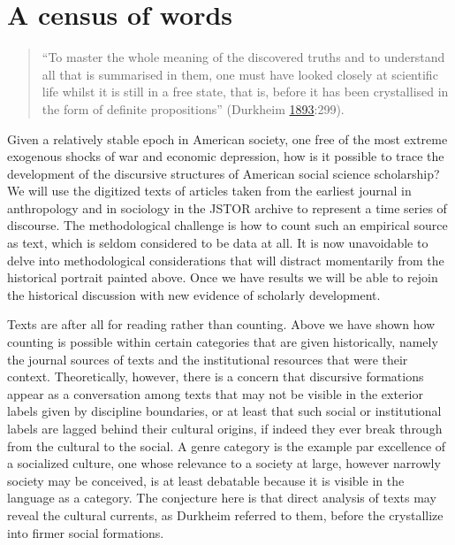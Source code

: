 \documentclass[]{book}
\theoremstyle{definition}
\theoremstyle{definition}
\theoremstyle{definition}
\theoremstyle{remark}
\begin{document}
\hypertarget{a-census-of-words}{%
\section{\texorpdfstring{ A census of
words}{ A census of words}}\label{a-census-of-words}}

\begin{quote}
``To master the whole meaning of the discovered truths and to understand
all that is summarised in them, one must have looked closely at
scientific life whilst it is still in a free state, that is, before it
has been crystallised in the form of definite propositions'' (Durkheim
\protect\hyperlink{ref-Durkheim1893division}{1893}:299).
\end{quote}

Given a relatively stable epoch in American society, one free of the
most extreme exogenous shocks of war and economic depression, how is it
possible to trace the development of the discursive structures of
American social science scholarship? We will use the digitized texts of
articles taken from the earliest journal in anthropology and in
sociology in the JSTOR archive to represent a time series of discourse.
The methodological challenge is how to count such an empirical source as
text, which is seldom considered to be data at all. It is now
unavoidable to delve into methodological considerations that will
distract momentarily from the historical portrait painted above. Once we
have results we will be able to rejoin the historical discussion with
new evidence of scholarly development.

Texts are after all for reading rather than counting. Above we have
shown how counting is possible within certain categories that are given
historically, namely the journal sources of texts and the institutional
resources that were their context. Theoretically, however, there is a
concern that discursive formations appear as a conversation among texts
that may not be visible in the exterior labels given by discipline
boundaries, or at least that such social or institutional labels are
lagged behind their cultural origins, if indeed they ever break through
from the cultural to the social. A genre category is the example par
excellence of a socialized culture, one whose relevance to a society at
large, however narrowly society may be conceived, is at least debatable
because it is visible in the language as a category. The conjecture here
is that direct analysis of texts may reveal the cultural currents, as
Durkheim referred to them, before the crystallize into firmer social
formations.
\end{document}
